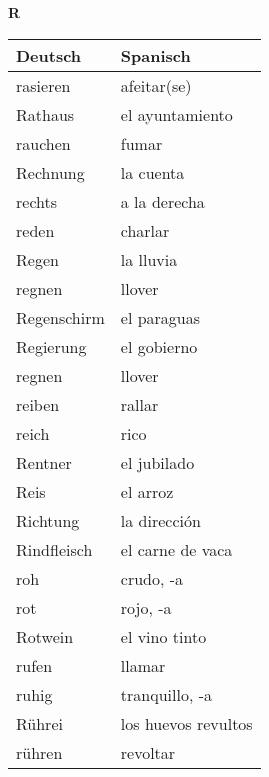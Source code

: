 \begin{flushright}\begin{Huge}\textbf{R}\end{Huge}\end{flushright}

\begin{longtable}{p{} p{}} 
\textbf{Deutsch}     & \textbf{Spanisch}                                       \\ \hline
\hline
\endhead %
rasieren & afeitar(se)\\
Rathaus & el ayuntamiento\\
rauchen & fumar\\
Rechnung & la cuenta\\
rechts & a la derecha\\
reden & charlar\\
Regen & la lluvia\\
regnen & llover\\
Regenschirm & el paraguas\\
Regierung & el gobierno\\
regnen & llover\\
reiben & rallar\\
reich & rico\\
Rentner & el jubilado \\
Reis & el arroz\\
Richtung & la dirección\\
Rindfleisch & el carne de vaca\\
roh & crudo, -a\\
rot & rojo, -a\\
Rotwein & el vino tinto \\
rufen & llamar \\
ruhig & tranquillo, -a\\
Rührei & los huevos revultos\\
rühren & revoltar\\

\end{longtable}
